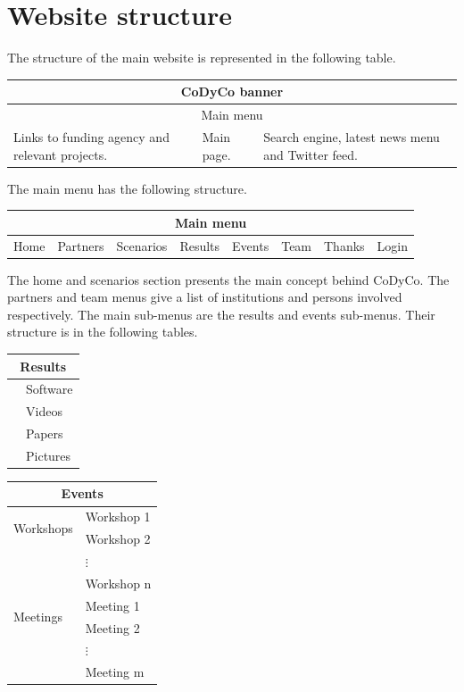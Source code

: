 \documentclass[12pt,a4paper,twoside]{article}
\begin{document}
\section{Website structure} \label {sec:struct}
The structure of the main website is represented in the following table.
\begin{center}
\begin{tabular}{ |p{3cm}|p{3cm}|p{3cm}| }
  \hline
  \multicolumn{3}{|c|}{CoDyCo banner} \\
  \hline
  \multicolumn{3}{|c|}{Main menu} \\
  \hline
  Links to funding agency and relevant projects. & Main page.  & Search engine, latest news menu and Twitter feed.\\
  \hline
\end{tabular}
\end{center}
The main menu has the following structure.
\begin{center}
\begin{tabular}{ |p{1.5cm}|p{1.5cm}|p{1.5cm}| p{1.5cm}|p{1.5cm}|p{1.5cm}|p{1.5cm}|p{1.5cm}|}
  \hline
  \multicolumn{8}{|c|}{Main menu} \\
  \hline
  Home & Partners & Scenarios & Results & Events & Team & Thanks & Login\\
  \hline
\end{tabular}
\end{center}
The home and scenarios section presents the main concept behind CoDyCo. The partners and team menus give a list of institutions and persons involved respectively. The main sub-menus are the results and events sub-menus. Their structure is in the following tables.
\begin{center}
\begin{tabular}[c]{ |p{1.5cm}|p{1.5cm}|}
  \hline
  \multicolumn{2}{|c|}{Results} \\
  \hline
   & Software\\
   & Videos\\
   & Papers\\
   & Pictures\\
  \hline
\end{tabular}
\hspace{3cm}
\begin{tabular}[c]{ |p{2cm}|p{4cm}|}
  \hline
  \multicolumn{2}{|c|}{Events} \\
  \hline
   \multirow{2}{*}{Workshops} & Workshop 1 \\
    & Workshop 2 \\
    & $\vdots$ \\
    & Workshop n \\
\cline{1-2}
   \multirow{2}{*}{Meetings} & Meeting 1\\
    & Meeting 2\\
    & $\vdots$ \\
    & Meeting m \\
  \hline
\end{tabular}
\end{center}
\end{document}
